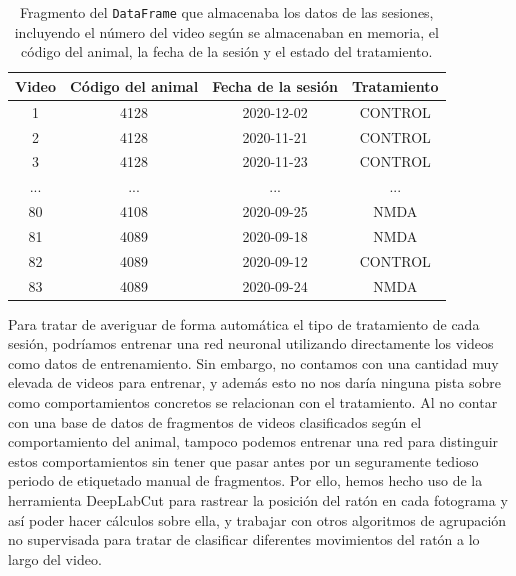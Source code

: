 \begin{table}[h]
  \centering
  \begin{tabular}{|c|c|c|c|}
    \hline
    \textbf{Video} & \textbf{Código del animal} & \textbf{Fecha de la sesión} & \textbf{Tratamiento} \\ 
    \hline
    1 & 4128	& 2020-12-02	& CONTROL \\ 	
    2 & 4128	& 2020-11-21	& CONTROL \\ 	
    3 & 4128	& 2020-11-23	& CONTROL \\ 
    ... &  ...	& ... & ... \\ 
    80 & 4108	& 2020-09-25	& NMDA	\\ 
    81 & 4089	& 2020-09-18	& NMDA	\\
    82 & 4089	& 2020-09-12	& CONTROL	\\ 
    83 & 4089	& 2020-09-24	& NMDA	\\
    \hline
  \end{tabular}
  \caption[Datos de las sesiones]{Fragmento del \texttt{DataFrame} que almacenaba los datos de las sesiones, incluyendo el número del video según se almacenaban en memoria, el código del animal, la fecha de la sesión y el estado del tratamiento.}
  \label{tab:animal-info}
\end{table}

Para tratar de averiguar de forma automática el tipo de tratamiento de cada sesión, podríamos entrenar una red neuronal utilizando directamente los videos como datos de entrenamiento. Sin embargo, no contamos con una cantidad muy elevada de videos para entrenar, y además esto no nos daría ninguna pista sobre como comportamientos concretos se relacionan con el tratamiento. Al no contar con una base de datos de fragmentos de videos clasificados según el comportamiento del animal, tampoco podemos entrenar una red para distinguir estos comportamientos sin tener que pasar antes por un seguramente tedioso periodo de etiquetado manual de fragmentos. Por ello, hemos hecho uso de la herramienta DeepLabCut para rastrear la posición del ratón en cada fotograma y así poder hacer cálculos sobre ella, y trabajar con otros algoritmos de agrupación no supervisada para tratar de clasificar diferentes movimientos del ratón a lo largo del video.

